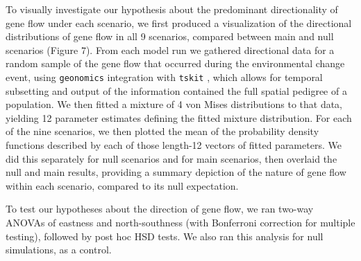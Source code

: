 \documentclass[9pt,twocolumn,twoside,lineno]{pnas-new}
\begin{document}
{To visually investigate our hypothesis about the predominant directionality of gene 
flow under each scenario, we first produced a visualization of the directional 
distributions of gene flow in all 9 scenarios, compared between main and null 
scenarios (Figure 7). From each model run we gathered directional data for a random 
sample of the gene flow that occurred during the environmental change event, using 
\texttt{geonomics} integration with \texttt{tskit} \cite{kelleher}, which allows for temporal 
subsetting and output of the information contained the full spatial pedigree of a 
population. We then fitted a mixture of 4 von Mises distributions to that data, 
yielding 12 parameter estimates defining the fitted mixture distribution. For each of 
the nine scenarios, we then plotted the mean of the probability density functions 
described by each of those length-12 vectors of fitted parameters. We did this 
separately for null scenarios and for main scenarios, then overlaid the null and main 
results, providing a summary depiction of the nature of gene flow within each 
scenario, compared to its null expectation.


To test our hypotheses about the direction of gene flow, we ran two-way ANOVAs of 
eastness and north-southness (with Bonferroni correction for multiple testing), 
followed by post hoc HSD tests. We also ran this analysis for null simulations, as a 
control.

} %

\showmatmethods{} %


\showacknow{} %


\end{document}
